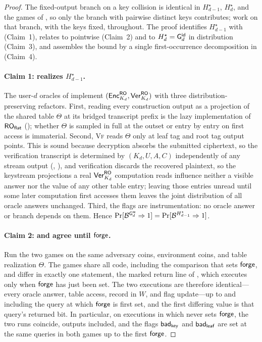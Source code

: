 \begin{proof}
The fixed-output branch on a key collision is identical in
$H_{d-1}^\star$, $H_d^\star$, and the games of
, so only the branch with pairwise
distinct keys contributes; work on that branch, with the keys fixed,
throughout. The proof identifies $H_{d-1}^\star$ with \Greal{}
(Claim~1), relates \Greal{} to \Grej{} pointwise (Claim~2) and \Grej{}
to $H_d^\star = \mathsf{G}^{\mathsf{id}}_{d}{}$ in distribution (Claim~3), and assembles the
bound by a single first-occurrence decomposition in \Grej{} (Claim~4).

\paragraph{Claim 1: \Greal{} realizes $H_{d-1}^\star$.}
The user-$d$ oracles of  implement
$(\mathsf{Enc}_{K_d}^{\mathsf{RO}}, \mathsf{Ver}_{K_d}^{\mathsf{RO}})$ with three distribution-preserving
refactors. First, reading every construction output as a projection of
the shared table $\Theta$ at its bridged transcript prefix is the lazy
implementation of $\mathsf{RO}_{\mathsf{flat}}$ (); whether $\Theta$ is
sampled in full at the outset or entry by entry on first access is
immaterial. Second, \textsc{Vf} reads $\Theta$ only at leaf tag and
root tag output points. This is sound because decryption absorbs the
submitted ciphertext, so the verification transcript is determined by
$(K_d, U, A, C)$ independently of any stream output
(, ), and verification discards the
recovered plaintext, so the keystream projections a real
$\mathsf{Ver}_{K_d}^{\mathsf{RO}}$ computation reads influence neither a visible answer
nor the value of any other table entry; leaving those entries unread
until some later computation first accesses them leaves the joint
distribution of all oracle answers unchanged. Third, the flags are
instrumentation: no oracle answer or branch depends on them. Hence
$\Pr[\mathcal{B}^{\mathsf{G}^{\mathsf{re}}_{d}} \Rightarrow 1]
= \Pr[\mathcal{B}^{H_{d-1}^\star} \Rightarrow 1]$.

\paragraph{Claim 2: \Greal{} and \Grej{} agree until $\mathsf{forge}$.}
Run the two games on the same adversary coins, environment coins, and
table realization $\Theta$. The games share all code, including the
comparison that sets $\mathsf{forge}$, and differ in exactly one statement, the
marked return line of , which executes
only when $\mathsf{forge}$ has just been set. The two executions are therefore
identical---every oracle answer, table access, record in $W$, and flag
update---up to and including the query at which $\mathsf{forge}$ is first set,
and the first differing value is that query's returned bit. In
particular, on executions in which \Grej{} never sets $\mathsf{forge}$, the two
runs coincide, outputs included, and the flags $\mathsf{bad}_{\mathsf{key}}$ and $\mathsf{bad}_{\mathsf{leaf}}$
are set at the same queries in both games up to the first $\mathsf{forge}$.


\end{proof}
